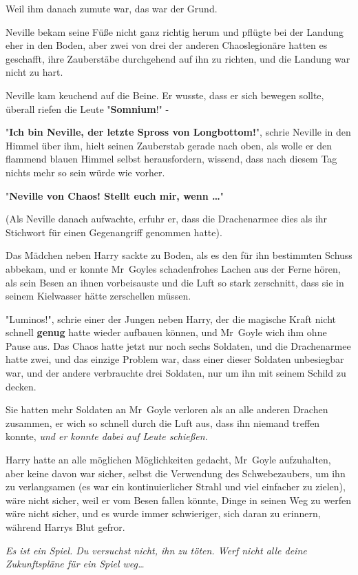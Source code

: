 {Weil ihm danach zumute war, das war der Grund.

Neville bekam seine Füße nicht ganz richtig herum und pflügte bei der Landung eher in den Boden, aber zwei von drei der anderen Chaoslegionäre hatten es geschafft, ihre Zauberstäbe durchgehend auf ihn zu richten, und die Landung war nicht zu hart.

Neville kam keuchend auf die Beine. Er wusste, dass er sich bewegen sollte, überall riefen die Leute "\textbf{Somnium}!" -

"\textbf{Ich bin Neville, der letzte Spross von Longbottom!}", schrie Neville in den Himmel über ihm, hielt seinen Zauberstab gerade nach oben, als wolle er den flammend blauen Himmel selbst herausfordern, wissend, dass nach diesem Tag nichts mehr so sein würde wie vorher.

"\textbf{Neville von Chaos! Stellt euch mir, wenn …}"

(Als Neville danach aufwachte, erfuhr er, dass die Drachenarmee dies als ihr Stichwort für einen Gegenangriff genommen hatte).

Das Mädchen neben Harry sackte zu Boden, als es den für ihn bestimmten Schuss abbekam, und er konnte Mr~Goyles schadenfrohes Lachen aus der Ferne hören, als sein Besen an ihnen vorbeisauste und die Luft so stark zerschnitt, dass sie in seinem Kielwasser hätte zerschellen müssen.

"Luminos!", schrie einer der Jungen neben Harry, der die magische Kraft nicht schnell \textbf{genug} hatte wieder aufbauen können, und Mr~Goyle wich ihm ohne Pause aus. Das Chaos hatte jetzt nur noch sechs Soldaten, und die Drachenarmee hatte zwei, und das einzige Problem war, dass einer dieser Soldaten unbesiegbar war, und der andere verbrauchte drei Soldaten, nur um ihn mit seinem Schild zu decken.

Sie hatten mehr Soldaten an Mr~Goyle verloren als an alle anderen Drachen zusammen, er wich so schnell durch die Luft aus, dass ihn niemand treffen konnte, \emph{und er konnte dabei auf Leute schießen.}

Harry hatte an alle möglichen Möglichkeiten gedacht, Mr~Goyle aufzuhalten, aber keine davon war sicher, selbst die Verwendung des Schwebezaubers, um ihn zu verlangsamen (es war ein kontinuierlicher Strahl und viel einfacher zu zielen), wäre nicht sicher, weil er vom Besen fallen könnte, Dinge in seinen Weg zu werfen wäre nicht sicher, und es wurde immer schwieriger, sich daran zu erinnern, während Harrys Blut gefror.

\emph{Es ist ein Spiel. Du versuchst nicht, ihn zu töten. Werf nicht alle deine Zukunftspläne für ein Spiel weg…}

}
